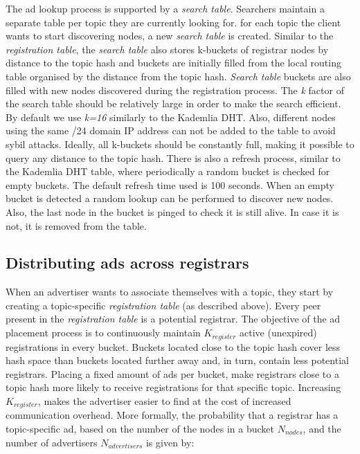The ad lookup process is supported by a \emph{search table}. 
Searchers maintain a separate table per topic they are currently looking for. 
\ie for each topic the client wants to start discovering nodes, a new \emph{search table} is created. 
Similar to the \emph{registration table}, the \emph{search table} also stores k-buckets of registrar nodes by distance to the topic hash and buckets are initially filled from the local routing table organised by the distance from the topic hash.
\emph{Search table} buckets are also filled with new nodes discovered during the registration process.
The \emph{k} factor of the search table should be relatively large in order to make the search efficient. 
By default we use \emph{k=16} similarly to the Kademlia DHT. 
Also, different nodes using the same /24 domain IP address can not be added to the table to avoid sybil attacks.
Ideally, all k-buckets should be constantly full, making it possible to query any distance to the topic hash. 
There is also a refresh process, similar to the Kademlia DHT table, where periodically a random bucket is checked for empty buckets. The default refresh time used is 100 seconds. 
When an empty bucket is detected a random lookup can be performed to discover new nodes.
Also, the last node in the bucket is pinged to check it is still alive. 
In case it is not, it is removed from the table.


\subsection{Distributing ads across registrars}\label{sec:registration_multi}
When an advertiser wants to associate themselves with a topic, they start by creating a topic-specific \emph{registration table} (as described above). 
Every peer present in the \emph{registration table} is a potential registrar. 
The objective of the ad placement process is to continuously maintain $K_\textit{register}$ active (\ie unexpired) registrations in every bucket. 
Buckets located close to the topic hash cover less hash space than buckets located further away and, in turn, contain less potential registrars. 
Placing a fixed amount of ads per bucket, make registrars close to a topic hash more likely to receive registrations for that specific topic. 
Increasing $K_\textit{register}$, makes the advertiser easier to find at the cost of increased communication overhead. More formally, the probability that a registrar has a topic-specific ad, based on the number of the nodes in a bucket $N_\textit{nodes}$, and the number of advertisers $N_\textit{advertisers}$ is given by:

